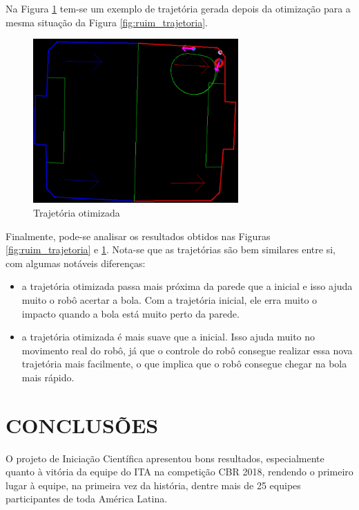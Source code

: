 \documentclass[10pt,fleqn,a4paper]{article}
\begin{document}
Na Figura \ref{fig:bom_trajetoria} tem-se um exemplo de trajetória gerada depois da otimização para a mesma situação da Figura \ref{fig:ruim_trajetoria}.

\begin{figure}[H]
	\centering
	\includegraphics[width=0.7\textwidth]{figures/bom_trajetoria.png}
	\caption{Trajetória otimizada}
	\label{fig:bom_trajetoria}
\end{figure}

Finalmente, pode-se analisar os resultados obtidos nas Figuras \ref{fig:ruim_trajetoria} e \ref{fig:bom_trajetoria}. Nota-se que as trajetórias são bem similares entre si, com algumas notáveis diferenças:

\begin{itemize}
\item a trajetória otimizada passa mais próxima da parede que a inicial e isso ajuda muito o robô acertar a bola. Com a trajetória inicial, ele erra muito o impacto quando a bola está muito perto da parede.
\item a trajetória otimizada é mais suave que a inicial. Isso ajuda muito no movimento real do robô, já que o controle do robô consegue realizar essa nova trajetória mais facilmente, o que implica que o robô consegue chegar na bola mais rápido.
\end{itemize}

	\section{CONCLUSÕES}
O projeto de Iniciação Científica apresentou bons resultados, especialmente quanto à vitória da equipe do ITA na competição CBR 2018, rendendo o primeiro lugar à equipe, na primeira vez da história, dentre mais de 25 equipes participantes de toda América Latina.
\end{document}

